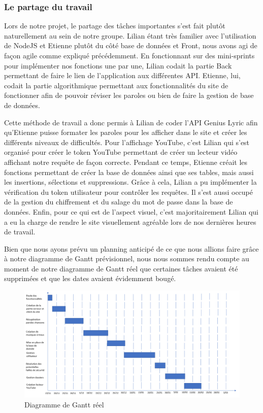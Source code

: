 \documentclass[12pt,french]{article}
\begin{document}
\subsubsection{Le partage du travail} 

Lors de notre projet, le partage des tâches importantes s'est fait plutôt naturellement au sein de notre groupe. Lilian étant très familier avec l'utilisation de NodeJS et Etienne plutôt du côté base de données et \gls{Front}, nous avons agi de façon agile comme expliqué précédemment. En fonctionnant sur des mini-\gls{sprint}s pour implémenter nos fonctions une par une, Lilian codait la partie \gls{Back} permettant de faire le lien de l'application aux différentes \gls{API}. Etienne, lui, codait la partie algorithmique permettant aux fonctionnalités du site de fonctionner afin de pouvoir réviser les paroles ou bien de faire la gestion de base de données.
\newline


Cette méthode de travail a donc permis à Lilian de coder l'\gls{API} Genius Lyric afin qu'Etienne puisse formater les paroles pour les afficher dans le site et créer les différents niveaux de difficultés. Pour l'affichage YouTube, c'est Lilian qui s'est organisé pour créer le token YouTube permettant de créer un lecteur vidéo affichant notre requête de façon correcte. Pendant ce temps, Etienne créait les fonctions permettant de créer la base de données ainsi que ses tables, mais aussi les insertions, sélections et suppressions. Grâce à cela, Lilian a pu implémenter la vérification du token utilisateur pour contrôler les requêtes. Il s'est aussi occupé de la gestion du chiffrement et du salage du mot de passe dans la base de données. Enfin, pour ce qui est de l'aspect visuel, c'est majoritairement Lilian qui a eu la charge de rendre le site visuellement agréable lors de nos dernières heures de travail.
\newline   

Bien que nous ayons prévu un planning anticipé de ce que nous allions faire grâce à notre diagramme de Gantt prévisionnel, nous nous sommes rendu compte au moment de notre diagramme de Gantt réel que certaines tâches avaient été supprimées et que les dates avaient évidemment bougé.

\begin{figure}[H]
	\centering
	\includegraphics[scale=0.5]{ganttreel.png}
	\caption{Diagramme de Gantt réel}    
\end{figure}
\end{document}
